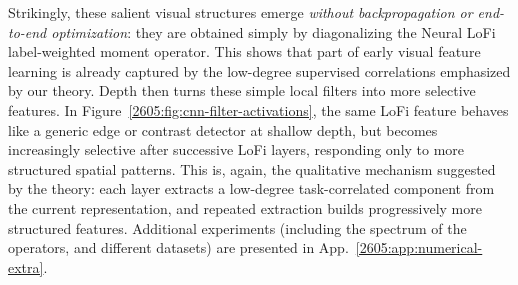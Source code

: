 Strikingly, these salient visual structures emerge {\it without backpropagation or end-to-end optimization}: they are obtained simply by diagonalizing the Neural LoFi label-weighted moment operator. This shows that part of early visual feature learning is already captured by the low-degree supervised correlations emphasized by our theory. Depth then turns these simple local filters into more selective features. In Figure~\ref{2605:fig:cnn-filter-activations}, the same LoFi feature behaves like a generic edge or contrast detector at shallow depth, but becomes increasingly selective after successive LoFi layers, responding only to more structured spatial patterns. This is, again, the qualitative mechanism suggested by the theory: each layer extracts a low-degree task-correlated component from the current representation, and repeated extraction builds progressively more structured features. 
Additional  experiments (including the spectrum of the operators, and different datasets) are presented in App.~\ref{2605:app:numerical-extra}.
